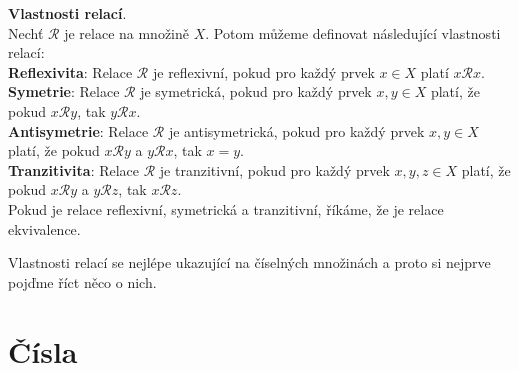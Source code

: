 \begin{definitionbox}
  \textbf{Vlastnosti relací}. \\
    Nechť $\mathcal R$ je relace na množině $X$. Potom můžeme definovat následující vlastnosti relací: \\

    \textbf{Reflexivita}: Relace $\mathcal R$ je reflexivní, pokud pro každý prvek $x\in X$ platí $x\mathcal Rx$. \\
    \textbf{Symetrie}: Relace $\mathcal R$ je symetrická, pokud pro každý prvek $x, y\in X$ platí, že pokud $x\mathcal Ry$, tak $y\mathcal Rx$. \\
    \textbf{Antisymetrie}: Relace $\mathcal R$ je antisymetrická, pokud pro každý prvek $x, y\in X$ platí, že pokud $x\mathcal Ry$ a $y\mathcal Rx$, tak $x = y$. \\
    \textbf{Tranzitivita}: Relace $\mathcal R$ je tranzitivní, pokud pro každý prvek $x, y, z\in X$ platí, že pokud $x\mathcal Ry$ a $y\mathcal Rz$, tak $x\mathcal Rz$. \\ 

  Pokud je relace reflexivní, symetrická a tranzitivní, říkáme, že je relace ekvivalence.
\end{definitionbox}

Vlastnosti relací se nejlépe ukazující na číselných množinách a proto si nejprve pojďme říct něco o nich.

\section{Čísla}